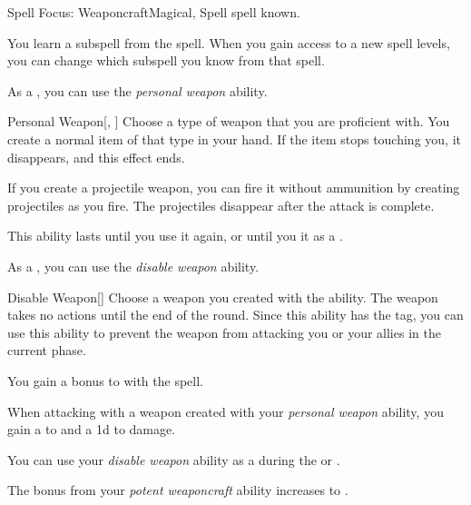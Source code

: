     \begin{feat}{Spell Focus: Weaponcraft}{Magical, Spell}
        \featpre {} spell known.

         You learn a subspell from the  spell.
        When you gain access to a new spell levels, you can change which subspell you know from that spell.

         As a , you can use the \textit{personal weapon} ability.
        \begin{ability}{Personal Weapon}[, ]
            Choose a type of weapon that you are proficient with.
            You create a normal item of that type in your hand.
            If the item stops touching you, it disappears, and this effect ends.

            If you create a projectile weapon, you can fire it without ammunition by creating projectiles as you fire.
            The projectiles disappear after the attack is complete.

            This ability lasts until you use it again, or until you  it as a .
        \end{ability}

         As a , you can use the \textit{disable weapon} ability.
        \begin{ability}{Disable Weapon}[]
            Choose a weapon you created with the  ability.
            The weapon takes no actions until the end of the round.
            Since this ability has the  tag, you can use this ability to prevent the weapon from attacking you or your allies in the current phase.
        \end{ability}

         You gain a  bonus to  with the  spell. 

         When attacking with a weapon created with your \textit{personal weapon} ability, you gain a   to  and a \plus1d  to damage.

         You can use your \textit{disable weapon} ability as a  during the  or .

         The bonus from your \textit{potent weaponcraft} ability increases to .
    \end{feat}

